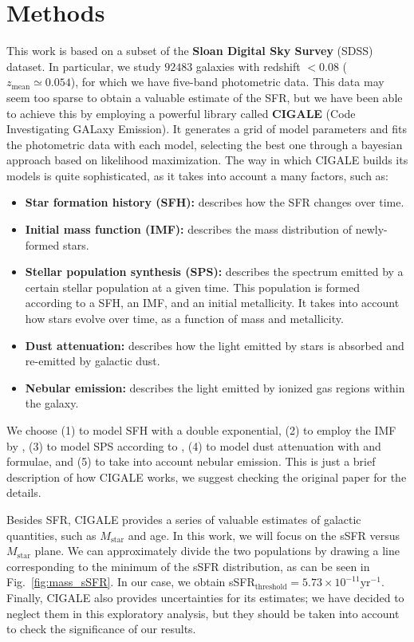 \documentclass[fleqn,usenatbib]{mnras}
\begin{document}
\section{Methods}\label{sec:methods}
This work is based on a subset of the \textbf{Sloan Digital Sky Survey} (SDSS) dataset. In particular, we study $92483$ galaxies with redshift $< 0.08$ ($z_{\text{mean}} \simeq 0.054$), for which we have five-band photometric data. This data may seem too sparse to obtain a valuable estimate of the SFR, but we have been able to achieve this by employing a powerful library called \textbf{CIGALE} (Code Investigating GALaxy Emission). It generates a grid of model parameters and fits the photometric data with each model, selecting the best one through a bayesian approach based on likelihood maximization. The way in which CIGALE builds its models is quite sophisticated, as it takes into account a many factors, such as:
\begin{itemize}[left=6pt]
    \item \textbf{Star formation history (SFH):} describes how the SFR changes over time.
    \item \textbf{Initial mass function (IMF):} describes the mass distribution of newly-formed stars.
    \item \textbf{Stellar population synthesis (SPS):} describes the spectrum emitted by a certain stellar population at a given time. This population is formed according to a SFH, an IMF, and an initial metallicity. It takes into account how stars evolve over time, as a function of mass and metallicity.
    \item \textbf{Dust attenuation:} describes how the light emitted by stars is absorbed and re-emitted by galactic dust.
    \item \textbf{Nebular emission:} describes the light emitted by ionized gas regions within the galaxy.
\end{itemize}
We choose (1) to model SFH with a double exponential, (2) to employ the IMF by \citet{Chabrier_2003}, (3) to model SPS according to \citet{Bruzual_2003}, (4) to model dust attenuation with \citet{Calzetti_2000} and \citet{Leitherer_2002} formulae, and (5) to take into account nebular emission. This is just a brief description of how CIGALE works, we suggest checking the original paper \citep{Boquien_2019} for the details.

Besides SFR, CIGALE provides a series of valuable estimates of galactic quantities, such as $M_{\text{star}}$ and age. In this work, we will focus on the sSFR versus $M_{\text{star}}$ plane. We can approximately divide the two populations by drawing a line corresponding to the minimum of the sSFR distribution, as can be seen in Fig.~\ref{fig:mass_sSFR}. In our case, we obtain sSFR$_{\text{threshold}} = 5.73 \times 10^{-11} \text{yr}^{-1}$. Finally, CIGALE also provides uncertainties for its estimates; we have decided to neglect them in this exploratory analysis, but they should be taken into account to check the significance of our results.
\end{document}
